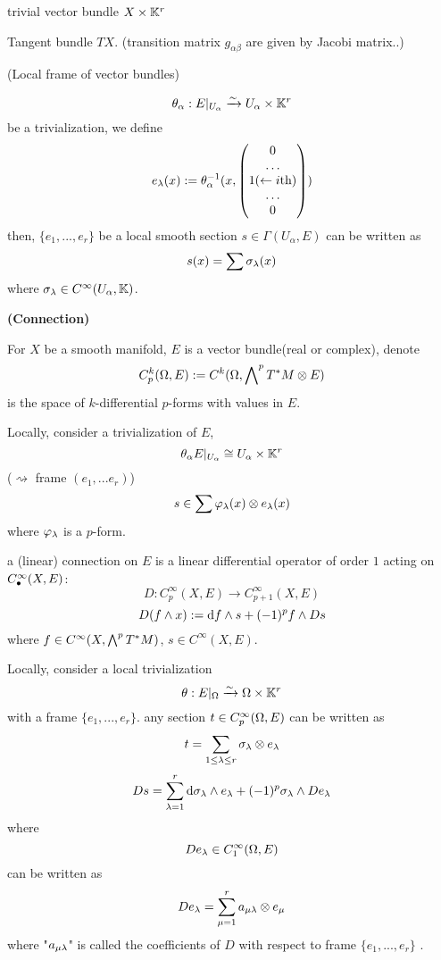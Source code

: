 \begin{example}trivial vector bundle $X\times\mathbb{K}^r$
\end{example}

\begin{example}Tangent bundle $TX$.
(transition matrix $g_{\alpha\beta}$ are given by Jacobi matrix..)
\end{example}

\begin{definition}(Local frame of vector bundles)

$$\theta_{\alpha}:E|_{U_{\alpha}}\xrightarrow{\sim} U_{\alpha}\times\mathbb{K}^r$$
be a trivialization, we define
$$
  e_{\lambda}(x):=
  \theta_{\alpha}^{-1}
  (x,\begin{pmatrix}
       0\\
       \ldots\\
       1(\leftarrow i\text{th})\\
       \ldots\\
       0
     \end{pmatrix})
$$
then, $\{e_1,...,e_r\}$ be a local smooth section
$s\in\Gamma(U_{\alpha},E)$ can be written as
$$s(x)=\sum\sigma_{\lambda}(x)$$
where $\sigma_{\lambda}\in C^{\infty}(U_\alpha,\mathbb{K})$.
\end{definition}

\textbf{(Connection)}

\begin{notation}

For $X$ be a smooth manifold, $E$ is a vector bundle(real or complex), denote
$$C_p^k(\Omega,E):=C^k(\Omega,\bigwedge\nolimits^{p}T^*M\otimes E)$$
is the space of $k$-differential $p$-forms with values in $E$.

Locally, consider a trivialization of $E$,
$$\theta_{\alpha}E|_{U_{\alpha}}\cong U_{\alpha}\times \mathbb{K}^{r}$$
($\rightsquigarrow$ frame $(e_1,...e_r)$)
$$s\in \sum\varphi_{\lambda}(x)\otimes e_{\lambda}(x)$$
where $\varphi_{\lambda}$ is a $p$-form.
\end{notation}

\begin{definition}
a (linear) connection on $E$ is a linear differential operator of order $1$ acting on
$C^{\infty}_{\bullet}(X,E)$:
$$D:C_{p}^{\infty}(X,E)\to C_{p+1}^{\infty}(X,E)$$
$$D(f\wedge x):= \mathrm{d} f\wedge s+(-1)^p f\wedge Ds$$
where $f\in C^{\infty}(X,\bigwedge\nolimits^{p}T^*M)$, $s\in C^{\infty}(X,E)$.
\end{definition}

Locally, consider a local trivialization
$$\theta:E|_{\Omega}\xrightarrow{\sim}\Omega\times\mathbb{K}^r$$
with a frame $\{e_1,...,e_r\}$. any section
$t\in C^{\infty}_p(\Omega,E)$ can be written as
$$t=\sum_{1\leq\lambda\leq r}\sigma_{\lambda}\otimes e_{\lambda}$$
$$Ds=\sum_{\lambda=1}^r\mathrm{d}\sigma_{\lambda}\wedge e_{\lambda}+(-1)^p\sigma_{\lambda}\wedge De_{\lambda}$$
where
$$De_{\lambda}\in C_1^{\infty}(\Omega, E)$$
can be written as
$$De_{\lambda}=\sum_{\mu=1}^r
             a_{\mu\lambda}\otimes e_{\mu}$$
where "$a_{\mu \lambda}$" is called the coefficients of $D$
 with respect to frame $\{e_1,...,e_r\}$ .

